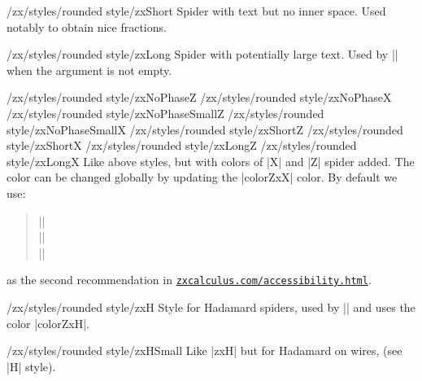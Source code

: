 \documentclass[a4paper,doc2]{ltxdoc} %
\begin{document}
\begin{stylekey}{/zx/styles/rounded style/zxShort}
  Spider with text but no inner space. Used notably to obtain nice fractions.
\end{stylekey}

\begin{stylekey}{/zx/styles/rounded style/zxLong}
  Spider with potentially large text. Used by |\zxX{\alpha}| when the argument is not empty.
\end{stylekey}

\begin{pgfmanualentry}
  \makeatletter
  \def\extrakeytext{style, }
  \extractkey/zx/styles/rounded style/zxNoPhaseZ\@nil%
  \extractkey/zx/styles/rounded style/zxNoPhaseX\@nil%
  \extractkey/zx/styles/rounded style/zxNoPhaseSmallZ\@nil%
  \extractkey/zx/styles/rounded style/zxNoPhaseSmallX\@nil%
  \extractkey/zx/styles/rounded style/zxShortZ\@nil%
  \extractkey/zx/styles/rounded style/zxShortX\@nil%
  \extractkey/zx/styles/rounded style/zxLongZ\@nil%
  \extractkey/zx/styles/rounded style/zxLongX\@nil%
  \makeatother
  \pgfmanualbody
  Like above styles, but with colors of |X| and |Z| spider added. The color can be changed globally by updating the |colorZxX| color. By default we use:
  \begin{verse}
    ||\\
    ||\\
    ||
  \end{verse}
  as the second recommendation in \href{https://zxcalculus.com/accessibility.html}{\texttt{zxcalculus.com/accessibility.html}}.
\end{pgfmanualentry}

\begin{stylekey}{/zx/styles/rounded style/zxH}
  Style for Hadamard spiders, used by |\zxH{}| and uses the color |colorZxH|.
\end{stylekey}

\begin{stylekey}{/zx/styles/rounded style/zxHSmall}
  Like |zxH| but for Hadamard on wires, (see |H| style).
\end{stylekey}
\end{document}

